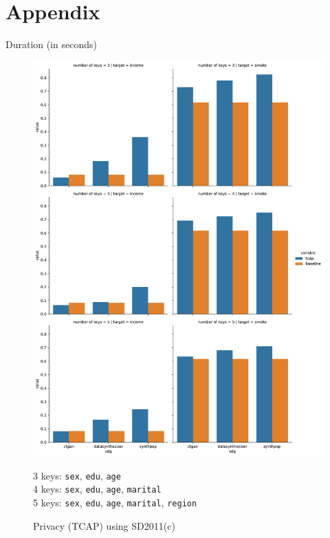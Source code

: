 
\section{Appendix}\label{sec:appendix}
\setcounter{figure}{0}    
\setcounter{table}{0}    
\renewcommand*\thetable{\Alph{section}.\arabic{table}}
\renewcommand*\thefigure{\Alph{section}.\arabic{figure}}
\renewcommand{\theHfigure}{\Alph{section}.\arabic{table}}
\renewcommand{\theHtable}{\Alph{section}.\arabic{figure}}

\begin{table}[ht]
    \caption{Duration (in seconds)}
    \centering
    \resizebox{\textwidth}{!}{}
    \label{table:table_sd2011_duration_v2}
\end{table}


\begin{figure}[ht]
  \caption{Privacy (TCAP) using SD2011(c)}
  \label{fig:privacy}
  \centering
  \includegraphics[width=\linewidth]{../graphs/graph_privacy.pdf}
  \raggedright{\footnotesize{
  3 keys: \texttt{sex}, \texttt{edu}, \texttt{age} \\
  4 keys: \texttt{sex}, \texttt{edu}, \texttt{age}, \texttt{marital} \\
  5 keys: \texttt{sex}, \texttt{edu}, \texttt{age}, \texttt{marital}, \texttt{region} \\
  }
}

\end{figure}


